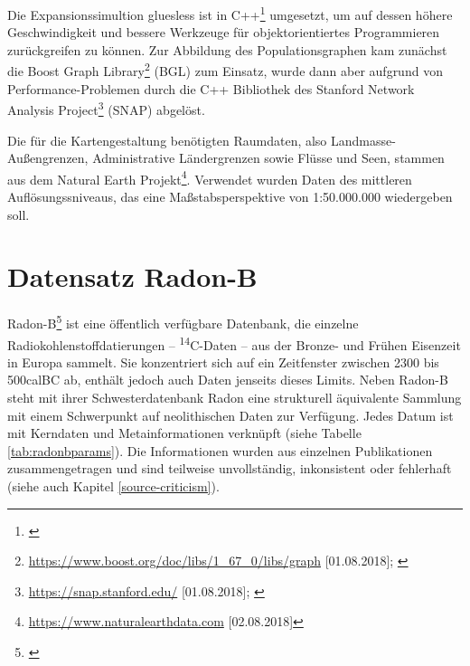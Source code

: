 \documentclass[openany,twoside,twocolumn]{book}
\let\rmarkdownfootnote\footnote%
\def\footnote{\protect\rmarkdownfootnote}
\begin{document}
Die Expansionssimultion gluesless ist in C++\footnote{\textcite{standard-cpp-foundation_international_2017}}
umgesetzt, um auf dessen höhere Geschwindigkeit und bessere Werkzeuge
für objektorientiertes Programmieren zurückgreifen zu können. Zur
Abbildung des Populationsgraphen kam zunächst die Boost Graph
Library\footnote{\url{https://www.boost.org/doc/libs/1_67_0/libs/graph}
  {[}01.08.2018{]}; \textcite{siek_boost_2002}} (BGL) zum Einsatz, wurde
dann aber aufgrund von Performance-Problemen durch die C++ Bibliothek
des Stanford Network Analysis Project\footnote{\url{https://snap.stanford.edu/}
  {[}01.08.2018{]}; \textcite{leskovec2016snap}} (SNAP) abgelöst.

Die für die Kartengestaltung benötigten Raumdaten, also
Landmasse-Außengrenzen, Administrative Ländergrenzen sowie Flüsse und
Seen, stammen aus dem Natural Earth Projekt\footnote{\url{https://www.naturalearthdata.com}
  {[}02.08.2018{]}}. Verwendet wurden Daten des mittleren
Auflösungssniveaus, das eine Maßstabsperspektive von 1:50.000.000
wiedergeben soll.

\hypertarget{radonb-dataset}{%
\section{Datensatz Radon-B}\label{radonb-dataset}}

Radon-B\footnote{\textcite{kneisel_radon-b_2013}} ist eine öffentlich
verfügbare Datenbank, die einzelne Radiokohlenstoffdatierungen --
\textsuperscript{14}C-Daten -- aus der Bronze- und Frühen Eisenzeit in
Europa sammelt. Sie konzentriert sich auf ein Zeitfenster zwischen 2300
bis 500calBC ab, enthält jedoch auch Daten jenseits dieses Limits. Neben
Radon-B steht mit ihrer Schwesterdatenbank
Radon\autocite{martin_hinz_radon_2012} eine strukturell äquivalente
Sammlung mit einem Schwerpunkt auf neolithischen Daten zur Verfügung.
Jedes Datum ist mit Kerndaten und Metainformationen verknüpft (siehe
Tabelle \ref{tab:radonbparams}). Die Informationen wurden aus einzelnen
Publikationen zusammengetragen und sind teilweise unvollständig,
inkonsistent oder fehlerhaft (siehe auch Kapitel
\ref{source-criticism}).
\end{document}
